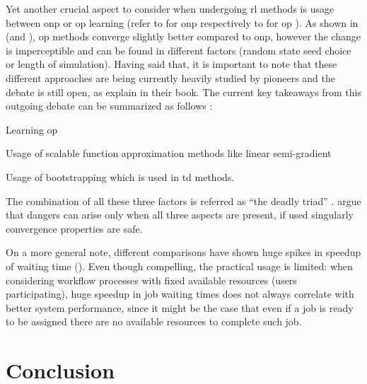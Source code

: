 \documentclass[draft=false]{seal_thesis}
\begin{document}
Yet another crucial aspect to consider when undergoing \gls{rl} methods is usage between \gls{onp} or \gls{op} learning (refer to  for \gls{onp} respectively to  for \gls{op} ). As shown in  (and ), \gls{op} methods converge slightly better compared to \gls{onp}, however the change is imperceptible and can be found in different factors (\eg random state seed choice or length of simulation). Having said that, it is important to note that these different approaches are being currently heavily studied by pioneers and the debate is still open, as \citet[pp. 245-249]{Sutton2017} explain in their book. The current key takeaways from this outgoing debate can be summarized as follows \citep{Sutton2017}:
\begin{enumerate*}
	\item Learning \gls{op}
	\item Usage of scalable function approximation methods like linear semi-gradient 
	\item Usage of bootstrapping which is used in \gls{td} methods.
\end{enumerate*}

The combination of all these three factors is referred as ``the deadly triad'' \citep[p. 249]{Sutton2017}. \citet[p. 249]{Sutton2017} argue that dangers can arise only when all three aspects are present, if used singularly convergence properties are safe.

On a more general note, different comparisons have shown huge spikes in speedup of waiting time (\eg {}). Even though compelling, the practical usage is limited: when considering workflow processes with fixed available resources (\ie users participating), huge speedup in job waiting times does not always correlate with better system performance, since it might be the case that even if a job is ready to be assigned there are no available resources to complete such job.


\glsresetall

\chapter{Conclusion}
\label{ch:conclusion}
\end{document}
